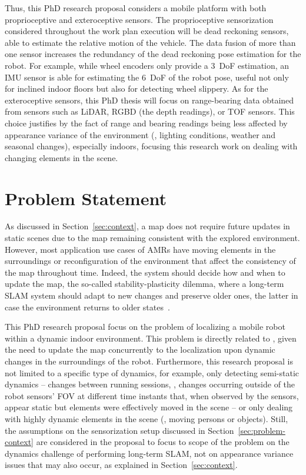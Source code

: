 Thus, this PhD research proposal considers a mobile platform with both proprioceptive and exteroceptive sensors.
The proprioceptive sensorization considered throughout the work plan execution will be dead reckoning sensors, able to estimate the relative motion of the vehicle. The data fusion of more than one sensor increases the redundancy of the dead reckoning pose estimation for the robot. For example, while wheel encoders only provide a 3~\gls{DoF} estimation, an \gls{IMU} sensor is able for estimating the 6~\gls{DoF} of the robot pose, useful not only for inclined indoor floors but also for detecting wheel slippery.
As for the exteroceptive sensors, this PhD thesis will focus on range-bearing data obtained from sensors such as \gls{LiDAR}, RGBD (the depth readings), or \gls{TOF} sensors.
This choice justifies by the fact of range and bearing readings being less affected by appearance variance of the environment (\eg, lighting conditions, weather and seasonal changes), especially indoors, focusing this research work on dealing with changing elements in the scene.






\section{Problem Statement}\label{sec:problem-statement}

As discussed in Section~\ref{sec:context}, a map does not require future updates in static scenes due to the map remaining consistent with the explored environment. However, most application use cases of \glspl{AMR} have moving elements in the surroundings or reconfiguration of the environment that affect the consistency of the map throughout time. Indeed, the system should decide how and when to update the map, the so-called stability-plasticity dilemma, where a long-term \gls{SLAM} system should adapt to new changes and preserve older ones, the latter in case the environment returns to older states~\cite{biber-duckett:2009:0278364908096286}.

This PhD research proposal focus on the problem of localizing a mobile robot within a dynamic indoor environment.
This problem is directly related to , given the need to update the map concurrently to the localization upon dynamic changes in the surroundings of the robot.
Furthermore, this research proposal is not limited to a specific type of dynamics, for example, only detecting semi-static dynamics -- changes between running sessions, \ie, changes occurring outside of the robot sensors' \gls{FOV} at different time instants that, when observed by the sensors, appear static but elements were effectively moved in the scene -- or only dealing with highly dynamic elements in the scene (\eg, moving persons or objects).
Still, the assumptions on the sensorization setup discussed in Section~\ref{sec:problem-context} are considered in the proposal to focus to scope of the problem on the dynamics challenge of performing long-term \gls{SLAM}, not on appearance variance issues that may also occur, as explained in Section~\ref{sec:context}.

